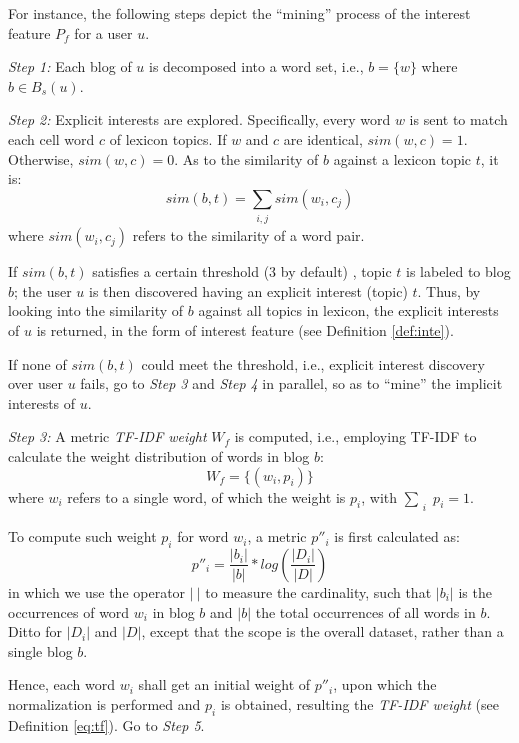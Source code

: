 For instance, the following steps depict the ``mining'' process of the interest feature $P_f$ for a user $u$.

\textit{Step 1:} Each blog of $u$ is decomposed into a word set, i.e., $b = \{w\}$ where $b \in B_s(u)$.

\textit{Step 2:} Explicit interests are explored. Specifically, every word $w$ is sent to match each cell word $c$ of lexicon topics.
If $w$ and $c$ are identical, $sim(w, c) = 1$.
Otherwise, $sim(w, c) = 0$.
As to the similarity of $b$ against a lexicon topic $t$, it is:
\begin{equation}
\label{eq:bt}
sim(b, t) = \sum_{\substack{i, j}} sim(w_i, c_j)
\end{equation}
where $sim(w_i, c_j)$ refers to the similarity of a word pair.

If $sim(b, t)$ satisfies a certain threshold (3 by default) , topic $t$ is labeled to blog $b$;
the user $u$ is then discovered having an explicit interest (topic) $t$.
Thus, by looking into the similarity of $b$ against all topics in lexicon, the explicit interests of $u$ is returned, in the form of interest feature (see Definition \ref{def:inte}).

If none of $sim(b, t)$ could meet the threshold, i.e., explicit interest discovery over user $u$ fails, go to \textit{Step 3} and \textit{Step 4} in parallel, so as to ``mine'' the implicit interests of $u$.

\textit{Step 3:} A metric \textit{TF-IDF weight} $W_f$ is computed, i.e., employing TF-IDF  to calculate the weight distribution of words in blog $b$:
\begin{equation}
\label{eq:tf}
W_f = \{(w_i, p_i)\}
\end{equation}
where $w_i$ refers to a single word, of which the weight is $p_i$, with $\sum_{\substack{i}} p_i = 1$.

To compute such weight $p_i$ for word $w_i$, a metric $p''_i$ is first calculated as:
\begin{equation}
\label{eq:tf-w}
p''_i = \frac{|b_i|}{|b|} * log(\frac{|D_i|}{|D|})
\end{equation}
in which we use the operator $|\ |$ to measure the cardinality, such that $|b_i|$ is the occurrences of word $w_i$ in blog $b$ and $|b|$ the total occurrences of all words in $b$.
Ditto for $|D_i|$ and $|D|$, except that the scope is the overall dataset, rather than a single blog $b$.

Hence, each word $w_i$ shall get an initial weight of $p''_i$, upon which the normalization is performed and $p_i$ is obtained, resulting the \textit{TF-IDF weight} (see Definition \ref{eq:tf}).
Go to \textit{Step 5}.

